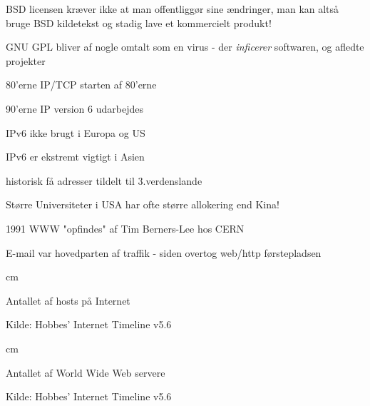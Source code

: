 \documentclass[Screen16to9,17pt,footrule]{foils}
\begin{document}

\begin{list1}
 \item BSD licensen kræver ikke at man offentliggør sine ændringer,
 man kan altså bruge BSD kildetekst og stadig lave et kommercielt
 produkt!
\item GNU GPL bliver af nogle omtalt som en virus - der
  \emph{inficerer} softwaren, og afledte projekter
\end{list1}




\begin{list1}
\item 80'erne IP/TCP starten af 80'erne
\item 90'erne IP version 6 udarbejdes
  \begin{list2}
  \item IPv6 ikke brugt i Europa og US
  \item IPv6 er ekstremt vigtigt i Asien
  \item historisk få adresser tildelt til 3.verdenslande
  \item Større Universiteter i USA har ofte større allokering end Kina!
  \end{list2}
\item 1991 WWW "opfindes" af Tim Berners-Lee hos CERN
\item E-mail var hovedparten af traffik
  - siden overtog web/http førstepladsen
\end{list1}


 cm

\centerline{Antallet af hosts på Internet}


\begin{list1}
\item Kilde:
Hobbes' Internet Timeline v5.6\\
\end{list1}


 cm

\centerline{Antallet af World Wide Web servere}


\begin{list1}
\item Kilde: Hobbes' Internet Timeline v5.6\\
\end{list1}
\end{document}
